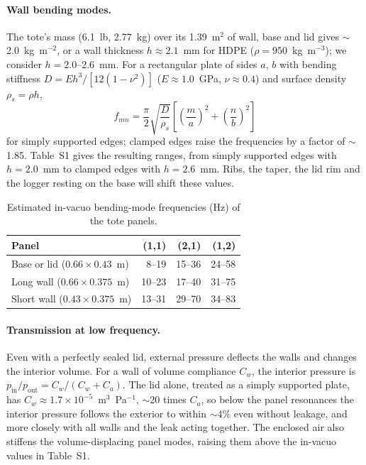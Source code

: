 \documentclass[11pt]{article}
\begin{document}
\paragraph{Wall bending modes.} The tote's mass (6.1~lb, 2.77~kg) over its 1.39~m$^2$ of wall, base
and lid gives $\sim$2.0~kg~m$^{-2}$, or a wall thickness $h \approx 2.1$~mm for HDPE
($\rho = 950$~kg~m$^{-3}$); we consider $h = 2.0$--2.6~mm. For a rectangular plate of sides $a$, $b$
with bending stiffness $D = Eh^3/[12(1-\nu^2)]$ ($E \approx 1.0$~GPa, $\nu \approx 0.4$) and surface
density $\rho_s = \rho h$,
\begin{equation}
  f_{mn} = \frac{\pi}{2}\sqrt{\frac{D}{\rho_s}}\left[\left(\frac{m}{a}\right)^2 + \left(\frac{n}{b}\right)^2\right]
\end{equation}
for simply supported edges; clamped edges raise the frequencies by a factor of $\sim$1.85.
Table~S1 gives the resulting ranges, from simply supported edges with $h = 2.0$~mm to clamped edges
with $h = 2.6$~mm. Ribs, the taper, the lid rim and the logger resting on the base will shift these
values.

\begin{table}[h]
  \centering
  \caption{Estimated in-vacuo bending-mode frequencies (Hz) of the tote panels.}
  \small
  \begin{tabular}{lrrr}
    \toprule
    Panel & (1,1) & (2,1) & (1,2) \\
    \midrule
    Base or lid ($0.66 \times 0.43$~m) & 8--19 & 15--36 & 24--58 \\
    Long wall ($0.66 \times 0.375$~m) & 10--23 & 17--40 & 31--75 \\
    Short wall ($0.43 \times 0.375$~m) & 13--31 & 29--70 & 34--83 \\
    \bottomrule
  \end{tabular}
\end{table}

\paragraph{Transmission at low frequency.} Even with a perfectly sealed lid, external pressure
deflects the walls and changes the interior volume. For a wall of volume compliance $C_w$, the
interior pressure is $p_\text{in}/p_\text{out} = C_w/(C_w + C_a)$. The lid alone, treated as a simply
supported plate, has $C_w \approx 1.7\times10^{-5}$~m$^3$~Pa$^{-1}$, $\sim$20 times $C_a$, so below the
panel resonances the interior pressure follows the exterior to within $\sim$4\% even without leakage,
and more closely with all walls and the leak acting together. The enclosed air also stiffens the
volume-displacing panel modes, raising them above the in-vacuo values in Table~S1.
\end{document}
